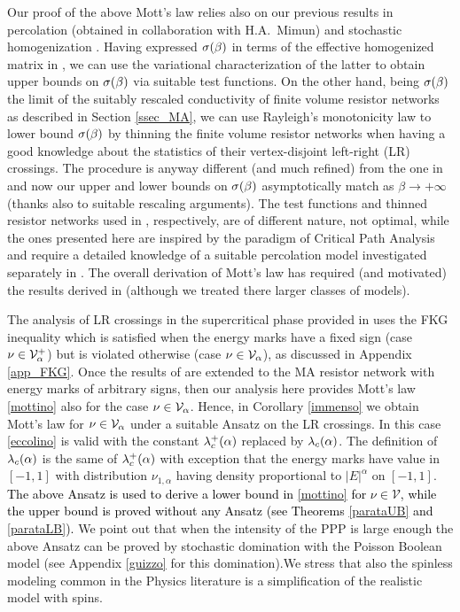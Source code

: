 \documentclass[12pt,a4paper,reqno]{amsart}
\newcommand{\cV}{\ensuremath{\mathcal V}}
\let\a=\alpha \let\b=\beta   \let\d=\delta  \let\e=\varepsilon
\newcommand{\rosso}{\textcolor{black}} %
\newcommand{\cv}{\rosso{\cV_\alpha}}
\newcommand{\cvp}{\rosso{\cV^+_\alpha}}
\begin{document}
Our proof of the above  Mott's law relies also  on our previous results in  percolation \cite{FagMim1,FagMim2} (obtained in collaboration with H.A.~Mimun) and stochastic  homogenization \cite{Fhom2}. Having expressed $\s(\b)$   in terms of the effective homogenized matrix in \cite{Fhom2}, we can use the variational characterization of the latter to obtain upper bounds on $\s(\b)$ via suitable test functions. On the other hand, being $\s(\b)$ the limit of the suitably rescaled conductivity of finite volume resistor networks as described in Section \ref{ssec_MA}, we can use Rayleigh's monotonicity law to lower bound 
$\s(\b)$ by thinning the finite volume resistor networks  when  having a good knowledge about the statistics of their  vertex-disjoint left-right (LR) crossings. The procedure is anyway different (and much refined) from the one in \cite{FM,FSS} and  now our upper and lower bounds on $\s(\b)$ asymptotically match as $\b\to+\infty$ (thanks also to suitable rescaling arguments). The test functions and thinned resistor networks used in \cite{FM,FSS}, respectively,  are of different nature, not optimal, while the ones presented here are inspired by the paradigm of Critical Path Analysis \cite{AHL} and require a detailed knowledge of a suitable percolation model investigated separately in   \cite{FagMim1,FagMim2}.
The overall derivation of Mott's law  has required (and motivated)   the  results derived in \cite{Fhom2,FagMim1,FagMim2} (although we treated there larger classes of models).


The analysis of LR  crossings in the supercritical phase provided  in \cite{FagMim2} uses the FKG inequality which is satisfied when the energy marks have a fixed sign (case $\nu \in \cvp$) but is violated otherwise (case $\nu\in \cv$), as discussed in Appendix \ref{app_FKG}. Once  the results of \cite{FagMim2} are extended  to the MA resistor network with energy marks of arbitrary signs, then our analysis here provides Mott's law \eqref{mottino} also for the case $\nu\in \cv$. Hence, in Corollary \ref{immenso} we obtain Mott's law for $\nu\in \cv$ under a suitable Ansatz on the LR crossings. In this case 
\eqref{eccolino} is valid with the constant $\l_c^+(\a)$ replaced by $\l_c(\a)$. The definition of $\l_c(\a)$ is the same of  $\l_c^+(\a)$  with exception that the energy marks have  value in $[-1,1]$  with  distribution $\nu_{1,\a}$ having  density proportional to $|E|^\a$ on $[-1,1]$. \rosso{The above Ansatz is used to derive a lower bound in \eqref{mottino} for $\nu\in \cV$, while the upper bound is proved without any Ansatz (see Theorems \ref{parataUB}  and \ref{parataLB}).} We point out that when  the intensity of the PPP is large enough  the above Ansatz  can be proved  by stochastic domination with the Poisson Boolean model (see Appendix \ref{guizzo} for this domination).We stress that also the spinless modeling common in the Physics literature is a simplification of the realistic model with spins.
\end{document}
